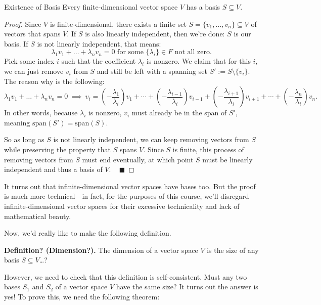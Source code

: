 \begin{theorem}{Existence of Basis}
    Every finite-dimensional vector space $V$ has a basis $S \subseteq V$.
\end{theorem}

\begin{proof}
    Since $V$ is finite-dimensional, there exists a finite set $S = \{v_1, \dots, v_n\} \subseteq V$ of vectors that spans $V$.  If $S$ is also linearly independent, then we're done: $S$ is our basis.  If $S$ is not linearly independent, that means:
    \[ \lambda_1 v_1 + \dots + \lambda_n v_n = 0 \text{ for some } \{\lambda_i\} \in F \text{ not all zero.} \]
    Pick some index $i$ such that the coefficient $\lambda_i$ is nonzero.  We claim that for this $i$, we can just remove $v_i$ from $S$ and still be left with a spanning set $S' := S \setminus \{v_i\}$.  The reason why is the following:
    \[ \lambda_1 v_1 + \dots + \lambda_n v_n = 0 ~ \implies ~ v_i = \left(-\dfrac{\lambda_1}{\lambda_i}\right)v_1 + \cdots + \left(-\dfrac{\lambda_{i - 1}}{\lambda_i}\right)v_{i - 1} + \left(-\dfrac{\lambda_{i + 1}}{\lambda_i}\right)v_{i + 1} + \cdots + \left(-\dfrac{\lambda_n}{\lambda_i}\right)v_n. \]
    In other words, because $\lambda_i$ is nonzero, $v_i$ must already be in the span of $S'$, meaning $\mathrm{span}(S') = \mathrm{span}(S)$.
    
    So as long as $S$ is not linearly independent, we can keep removing vectors from $S$ while preserving the property that $S$ spans $V$.  Since $S$ is finite, this process of removing vectors from $S$ must end eventually, at which point $S$ must be linearly independent and thus a basis of $V$. ~ $\blacksquare$
\end{proof}

\begin{remark}
It turns out that infinite-dimensional vector spaces have bases too.  But the proof is much more technical---in fact, for the purposes of this course, we'll disregard infinite-dimensional vector spaces for their excessive technicality and lack of mathematical beauty.
\end{remark}

Now, we'd really like to make the following definition.

\textbf{Definition? (Dimension?).} The dimension of a vector space $V$ is the size of any basis $S \subseteq V$\dots?

However, we need to check that this definition is self-consistent.  Must any two bases $S_1$ and $S_2$ of a vector space $V$ have the same size?  It turns out the answer is yes!  To prove this, we need the following theorem:

